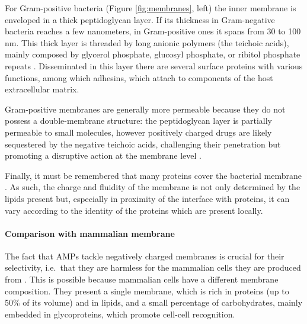For Gram-positive bacteria (Figure \ref{fig:membranes}, left) the inner membrane is enveloped in a thick peptidoglycan layer. If its thickness in Gram-negative bacteria reaches a few nanometers, in Gram-positive ones it spans from 30 to 100 nm. This thick layer is threaded by long anionic polymers (the teichoic acids), mainly composed by glycerol phosphate, glucosyl phosphate, or ribitol phosphate repeats \citep{Swoboda2009}. Disseminated in this layer there are several surface proteins with various functions, among which adhesins, which attach to components of the host extracellular matrix.

Gram-positive membranes are generally more permeable because they do not possess a double-membrane structure: the peptidoglycan layer is partially permeable to small molecules, however positively charged drugs are likely sequestered by the negative teichoic acids, challenging their penetration but promoting a disruptive action at the membrane level \citep{Malanovic2016}.

Finally, it must be remembered that many proteins cover the bacterial membrane \citep{Silhavy2010}. As such, the charge and fluidity of the membrane is not only determined by the lipids present but, especially in proximity of the interface with proteins, it can vary according to the identity of the proteins which are present locally.


\paragraph{Comparison with mammalian membrane}
The fact that AMPs tackle negatively charged membranes is crucial for their selectivity, i.e.\ that they are harmless for the mammalian cells they are produced from \citep{Glukhov2005}. This is possible because mammalian cells have a different membrane composition. They present a single membrane, which is rich in proteins (up to 50\% of its volume) and in lipids, and a small percentage of carbohydrates, mainly embedded in glycoproteins, which promote cell-cell recognition.

